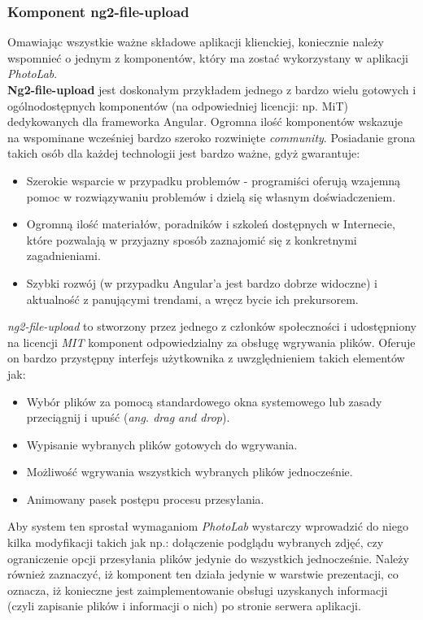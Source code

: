 	\subsubsection{Komponent ng2-file-upload}
	\quad Omawiając wszystkie ważne składowe aplikacji klienckiej, koniecznie należy wspomnieć o jednym z komponentów, który ma zostać wykorzystany w aplikacji \textit{PhotoLab}.\\
	\textbf{Ng2-file-upload} jest doskonałym przykładem jednego z bardzo wielu gotowych i ogólnodostępnych komponentów (na odpowiedniej licencji: np. MiT) dedykowanych dla frameworka Angular. Ogromna ilość komponentów wskazuje na wspominane wcześniej bardzo szeroko rozwinięte \textit{community}. Posiadanie grona takich osób dla każdej technologii jest bardzo ważne, gdyż gwarantuje: 
	\begin{itemize}
	    \item Szerokie wsparcie w przypadku problemów - programiści oferują wzajemną pomoc w rozwiązywaniu problemów i dzielą się własnym doświadczeniem.
	    \item Ogromną ilość materiałów, poradników i szkoleń dostępnych w Internecie, które pozwalają w przyjazny sposób zaznajomić się z konkretnymi zagadnieniami.
	    \item Szybki rozwój (w przypadku Angular'a jest bardzo dobrze widoczne) i aktualność z panującymi trendami, a wręcz bycie ich prekursorem.
	\end{itemize}
	\textit{ng2-file-upload} to stworzony przez jednego z członków społeczności i udostępniony na licencji \textit{MIT} komponent odpowiedzialny za obsługę wgrywania plików. Oferuje on bardzo przystępny interfejs użytkownika z uwzględnieniem takich elementów jak:
	\begin{itemize}
	    \item Wybór plików za pomocą standardowego okna systemowego lub zasady przeciągnij i upuść (\textit{ang. drag and drop}).
	    \item Wypisanie wybranych plików gotowych do wgrywania.
	    \item Możliwość wgrywania wszystkich wybranych plików jednocześnie.
	    \item Animowany pasek postępu procesu przesyłania.
	\end{itemize}
	Aby system ten sprostał wymaganiom \textit{PhotoLab} wystarczy wprowadzić do niego kilka modyfikacji takich jak np.: dołączenie podglądu wybranych zdjęć, czy ograniczenie opcji przesyłania plików jedynie do wszystkich jednocześnie. Należy również zaznaczyć, iż komponent ten działa jedynie w warstwie prezentacji, co oznacza, iż konieczne jest zaimplementowanie obsługi uzyskanych informacji (czyli zapisanie plików i informacji o nich) po stronie serwera aplikacji.

